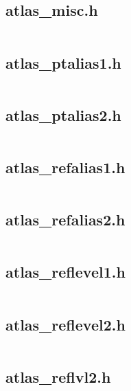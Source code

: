 \documentclass{article}
\begin{document}
\subsection{atlas\_misc.h}
\inputminted{c}{/home/dufferzafar/dev/@clones/scikit-learn/sklearn/src/cblas/atlas_misc.h}
\newpage

\subsection{atlas\_ptalias1.h}
\inputminted{c}{/home/dufferzafar/dev/@clones/scikit-learn/sklearn/src/cblas/atlas_ptalias1.h}
\newpage

\subsection{atlas\_ptalias2.h}
\inputminted{c}{/home/dufferzafar/dev/@clones/scikit-learn/sklearn/src/cblas/atlas_ptalias2.h}
\newpage

\subsection{atlas\_refalias1.h}
\inputminted{c}{/home/dufferzafar/dev/@clones/scikit-learn/sklearn/src/cblas/atlas_refalias1.h}
\newpage

\subsection{atlas\_refalias2.h}
\inputminted{c}{/home/dufferzafar/dev/@clones/scikit-learn/sklearn/src/cblas/atlas_refalias2.h}
\newpage

\subsection{atlas\_reflevel1.h}
\inputminted{c}{/home/dufferzafar/dev/@clones/scikit-learn/sklearn/src/cblas/atlas_reflevel1.h}
\newpage

\subsection{atlas\_reflevel2.h}
\inputminted{c}{/home/dufferzafar/dev/@clones/scikit-learn/sklearn/src/cblas/atlas_reflevel2.h}
\newpage

\subsection{atlas\_reflvl2.h}
\inputminted{c}{/home/dufferzafar/dev/@clones/scikit-learn/sklearn/src/cblas/atlas_reflvl2.h}
\newpage
\end{document}
